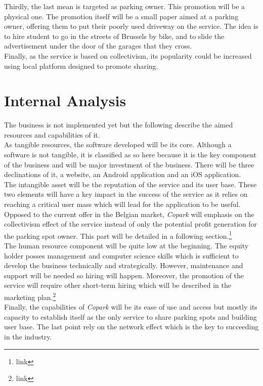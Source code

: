 \documentclass[12pt,a4paper,oneside]{book}
\newcommand{\bp}{\textit{Copark }}
\begin{document}
Thirdly, the last mean is targeted as parking owner. This promotion will be a physical one. The promotion itself will be a small paper aimed at a parking owner, offering them to put their poorly used driveway on the service. The idea is to hire student to go in the streets of Brussels by bike, and to slide the advertisement under the door of the garages that they cross.\\

Finally, as the service is based on collectivism, its popularity could be increased using local platform designed to promote sharing.

\section{Internal Analysis}
The business is not implemented yet but the following describe the aimed resources and capabilities of it.\\

As tangible resources, the software developed will be its core. Although a software is not tangible, it is classified as so here because it is the key component of the business and will be major investment of the business. There will be three declinations of it, a website, an Android application and an iOS application.\\

The intangible asset will be the reputation of the service and its user base. These two elements will have a key impact in the success of the service as it relies on reaching a critical user mass which will lead for the application to be useful. Opposed to the current offer in the Belgian market, \bp will emphasis on the collectivism effect of the service instead of only the potential profit generation for the parking spot owner. This part will be detailed in a following section.\footnote{link}\\

The human resource component will be quite low at the beginning. The equity holder posses management and computer science skills which is sufficient to develop the business technically and strategically. However, maintenance and support will be needed so hiring will happen. Moreover, the promotion of the service will require other short-term hiring which will be described in the marketing plan.\footnote{link}\\

Finally, the capabilities of \bp will be its ease of use and access but mostly its capacity to establish itself as the only service to share parking spots and building user base. The last point rely on the network effect which is the key to succeeding in the industry.
\end{document}

